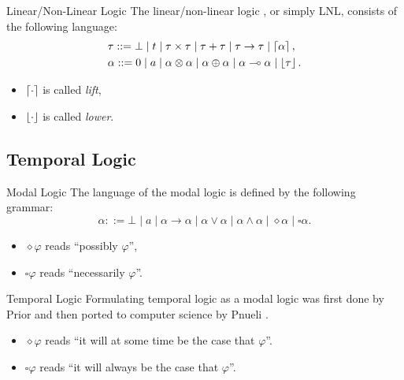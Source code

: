 \begin{frame}{Linear/Non-Linear Logic}
    The linear/non-linear logic \cite{DBLP:conf/csl/Benton94}, or simply LNL, consists of the following language:
    \begin{align*}
        &\tau ::= \bot \mid t \mid \tau \times \tau \mid \tau + \tau \mid \tau \rightarrow \tau \mid \left\lceil \alpha \right\rceil, \\
        &\alpha ::= 0 \mid a \mid \alpha \otimes \alpha \mid \alpha \oplus \alpha \mid \alpha \multimap \alpha \mid \left\lfloor \tau \right\rfloor.
    \end{align*}
    \begin{itemize}
        \item $\left\lceil \cdot \right\rceil$ is called \textit{lift},
        \item $\left\lfloor \cdot \right\rfloor$ is called \textit{lower}.
    \end{itemize}
\end{frame}

\subsection{Temporal Logic}

\begin{frame}{Modal Logic}
    The language of the modal logic is defined by the following grammar:
    \[
    \alpha ::= \bot \mid a \mid \alpha \rightarrow \alpha \mid \alpha \vee \alpha \mid \alpha \wedge \alpha \mid \diamond\alpha \mid \square\alpha.
    \]
    
    \begin{itemize}
        \item $\diamond\varphi$ reads ``possibly $\varphi$'',
        \item $\square\varphi$ reads ``necessarily $\varphi$''.
    \end{itemize}
\end{frame}

\begin{frame}{Temporal Logic}
    Formulating temporal logic as a modal logic was first done by Prior \cite{PRIOR1957,PRIOR1967,prior1968papers} and then ported to computer science by Pnueli \cite{DBLP:conf/focs/Pnueli77}.
    
    \begin{itemize}
        \item $\diamond\varphi$ reads ``it will at some time be the case that $\varphi$''.
        \item $\square\varphi$ reads ``it will always be the case that $\varphi$''.
    \end{itemize}
\end{frame}

